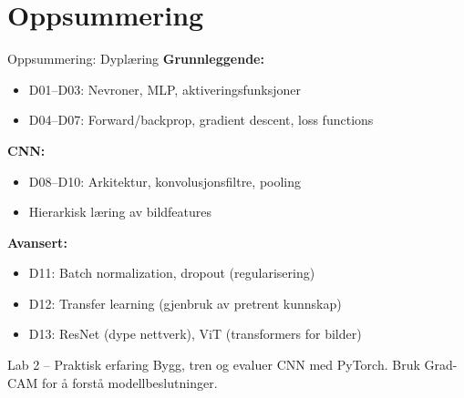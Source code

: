 \documentclass[aspectratio=169, 10pt]{beamer}
\begin{document}
\section*{Oppsummering}

\begin{frame}{Oppsummering: Dyplæring}
    \textbf{Grunnleggende:}
    \begin{itemize}
        \item D01--D03: Nevroner, MLP, aktiveringsfunksjoner
        \item D04--D07: Forward/backprop, gradient descent, loss functions
    \end{itemize}
    
    \textbf{CNN:}
    \begin{itemize}
        \item D08--D10: Arkitektur, konvolusjonsfiltre, pooling
        \item Hierarkisk læring av bildfeatures
    \end{itemize}
    
    \textbf{Avansert:}
    \begin{itemize}
        \item D11: Batch normalization, dropout (regularisering)
        \item D12: Transfer learning (gjenbruk av pretrent kunnskap)
        \item D13: ResNet (dype nettverk), ViT (transformers for bilder)
    \end{itemize}
    
    \vspace{0.3cm}
    \begin{block}{Lab 2 -- Praktisk erfaring}
        Bygg, tren og evaluer CNN med PyTorch. Bruk Grad-CAM for å forstå modellbeslutninger.
    \end{block}
\end{frame}
\end{document}
